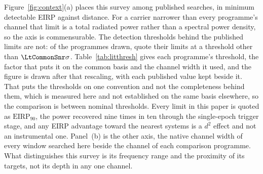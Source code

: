Figure~\ref{fig:context}(a) places this survey among published searches,
in minimum detectable EIRP against distance. For a carrier narrower than
every programme's channel that limit is a total radiated power rather than
a spectral power density, so the axis is commensurable. The detection
thresholds behind the published limits are not: of the \LtNProg{}
programmes drawn, \LtNRescaled{} quote their limits at a threshold other
than $\LtCommonSnr\sigma$. Table~\ref{tab:litthresh} gives each programme's
threshold, the factor that puts it on the common basis and the channel width
it used, and the figure is drawn after that rescaling, with each published
value kept beside it. That
puts the thresholds on one convention and not the completeness behind them,
which is measured here and not established on the same basis elsewhere, so
the comparison is between nominal thresholds. Every limit in this paper is
quoted as $\mathrm{EIRP}_{90}$, the power recovered nine times in ten through
the single-epoch trigger stage, and any EIRP advantage toward the nearest
systems is a $d^{2}$ effect and not an instrumental one.
Panel~(b) is the other axis, the native channel width of every window
searched here beside the channel of each comparison programme. What
distinguishes this survey is its frequency range and the proximity of its
targets, not its depth in any one channel.

\begin{table}
\centering
\caption{The comparison programmes of Figure~\ref{fig:context}, each on its
own detection threshold and on the common $\LtCommonSnr\sigma$ basis.
$\mathrm{EIRP}_{\rm min}$ is the deepest limit each paper reports, and the
factor is $\LtCommonSnr/(\mathrm{S/N})$, the minimum detectable flux being
linear in the threshold in every one of their own expressions for it.}
\label{tab:litthresh}
\scriptsize
\setlength{\tabcolsep}{4pt}

\end{table}

